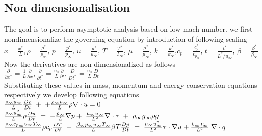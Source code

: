 \documentclass[11pt,a4paper]{article}
\begin{document}
\subsection{Non dimensionalisation}

The goal is to perform asymptotic analysis based on low mach number. we first nondimensionalize the governing equation by introduction of following scaling \\

$ x=\frac{x^*}{L}, \rho = \frac{\rho^*}{\rho_\infty}$, $p = \frac{p^*}{p_\infty} $, $u = \frac{u^*}{u_\infty} $, $T = \frac{T^*}{T_\infty} $, $\mu = \frac{\mu^*}{\mu_\infty} $, $k = \frac{k^*}{k_\infty} $,$c_p = \frac{c_p^*}{c_{p_\infty}}$, $ t = \frac{t^*}{L^*/u_{\infty}} $, $ \beta = \frac{\beta^*}{\beta_{\infty}}$\\
Now the derivatives are non dimensionalized as follows \\
$\frac{\partial}{\partial x^*}=\frac{1}{L}\frac{\partial}{\partial x},\frac{\partial}{\partial t^*}=\frac{u_0}{L}\frac{\partial}{\partial t} , \frac{D}{D t^*}=\frac{u_0}{L}\frac{D}{D t} $  \\
Substituting these values in mass, momentum and energy conservation equations respectively we develop following equations \\
$\frac{\rho_\infty u_\infty}{L}\frac{D \rho}{D t}\hspace{1mm}+\hspace{1mm}+\frac{\rho_\infty u_\infty}{L}\rho \nabla\cdot u = 0$ \\
$\frac{\rho_\infty u_\infty^2}{L}\rho\frac{D u}{D t}\hspace{1mm} =\hspace{1mm}-\frac{p_\infty}{L}\nabla p +\hspace{1mm}\frac{\mu_\infty u_\infty}{L^2}\nabla\cdot\tau \hspace{1mm}+\hspace{1mm}\rho_\infty g_\infty \rho g$ \\
$\frac{\rho_\infty c_{p_\infty} u_\infty T_\infty }{L} \rho c_p \frac{D T}{D t}\hspace{1mm}-\hspace{1mm}\frac{\beta_\infty p_\infty u_\infty T_\infty }{L} \beta T \frac{D p}{D t} \hspace{1mm} = \hspace{1mm} \frac{\mu_\infty u_\infty^2}{L^2} \tau \cdot\nabla u  + \frac{k_\infty T_\infty}{L^2} \hspace{1mm} \nabla \cdot q$ \\
\end{document}
